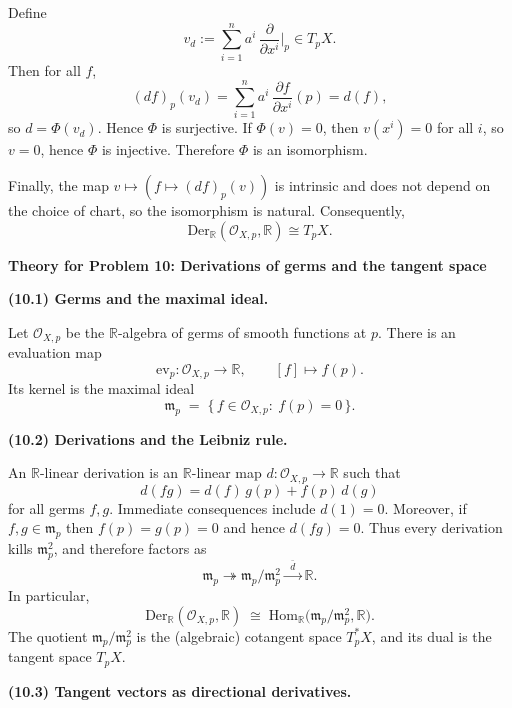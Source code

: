 \begin{solution}
Define
\[
v_d := \sum_{i=1}^n a^i\,\frac{\partial}{\partial x^i}\Big|_p \in T_pX.
\]
Then for all $f$,
\[
(df)_p(v_d)=\sum_{i=1}^n a^i\,\frac{\partial f}{\partial x^i}(p)=d(f),
\]
so $d=\Phi(v_d)$. Hence $\Phi$ is surjective. If $\Phi(v)=0$, then $v(x^i)=0$ for all $i$,
so $v=0$, hence $\Phi$ is injective. Therefore $\Phi$ is an isomorphism.

Finally, the map $v\mapsto (f\mapsto (df)_p(v))$ is intrinsic and does not depend on the choice of chart,
so the isomorphism is natural. Consequently,
\[
\mathrm{Der}_{\mathbb{R}}(\mathcal{O}_{X,p},\mathbb{R}) \cong T_pX.
\]


\par\medskip\noindent\textbf{Theory for Problem 10: Derivations of germs and the tangent space}\par\smallskip


\par\medskip\noindent\textbf{(10.1) Germs and the maximal ideal.}\par\smallskip

Let $\mathcal{O}_{X,p}$ be the $\mathbb{R}$-algebra of germs of smooth functions at $p$.
There is an evaluation map
\[
\mathrm{ev}_p:\mathcal{O}_{X,p}\to \mathbb{R},\qquad [f]\mapsto f(p).
\]
Its kernel is the maximal ideal
\[
\mathfrak{m}_p \;=\; \{\,f\in \mathcal{O}_{X,p}:\ f(p)=0\,\}.
\]

\par\medskip\noindent\textbf{(10.2) Derivations and the Leibniz rule.}\par\smallskip

An $\mathbb{R}$-linear derivation is an $\mathbb{R}$-linear map $d:\mathcal{O}_{X,p}\to \mathbb{R}$ such that
\[
d(fg)=d(f)\,g(p)+f(p)\,d(g)
\]
for all germs $f,g$. Immediate consequences include $d(1)=0$. Moreover, if $f,g\in \mathfrak{m}_p$ then
$f(p)=g(p)=0$ and hence $d(fg)=0$. Thus every derivation kills $\mathfrak{m}_p^2$, and therefore factors as
\[
\mathfrak{m}_p \twoheadrightarrow \mathfrak{m}_p/\mathfrak{m}_p^2 \xrightarrow{\;\;\bar d\;\;} \mathbb{R}.
\]
In particular,
\[
\mathrm{Der}_{\mathbb{R}}(\mathcal{O}_{X,p},\mathbb{R})
\;\cong\;
\mathrm{Hom}_{\mathbb{R}}\bigl(\mathfrak{m}_p/\mathfrak{m}_p^2,\mathbb{R}\bigr).
\]
The quotient $\mathfrak{m}_p/\mathfrak{m}_p^2$ is the (algebraic) cotangent space $T_p^*X$,
and its dual is the tangent space $T_pX$.

\par\medskip\noindent\textbf{(10.3) Tangent vectors as directional derivatives.}\par\smallskip


\end{solution}
